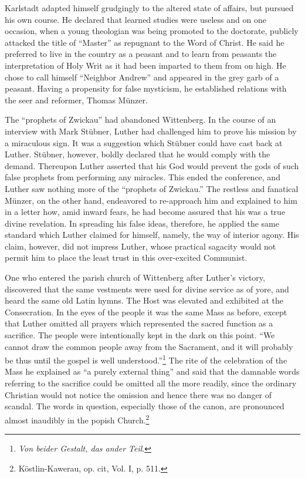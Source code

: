 Karlstadt adapted himself grudgingly to the altered state of affairs,
but pursued his own course. He declared that learned studies were
useless and on one occasion, when a young theologian was being promoted
to the doctorate, publicly attacked the title of “Master” as
repugnant to the Word of Christ. He said he preferred to live in the
country as a peasant and to learn from peasants the interpretation of
Holy Writ as it had been imparted to them from on high. He chose to
call himself “Neighbor Andrew” and appeared in the grey garb of a
peasant. Having a propensity for false mysticism, he established relations
with the seer and reformer, Thomas Münzer.

The “prophets of Zwickau” had abandoned Wittenberg. In the
course of an interview with Mark Stübner, Luther had challenged
him to prove his mission by a miraculous sign. It was a suggestion
which Stübner could have cast back at Luther. Stübner, however,
boldly declared that he would comply with the demand. Thereupon
Luther asserted that his God would prevent the gods of such false
prophets from performing any miracles. This ended the conference,
and Luther saw nothing more of the “prophets of Zwickau.” The
restless and fanatical Münzer, on the other hand, endeavored to re-approach
him and explained to him in a letter how, amid inward
fears, he had become assured that his was a true divine revelation. In
spreading his false ideas, therefore, he applied the same standard which
Luther claimed for himself, namely, the way of interior agony. His
claim, however, did not impress Luther, whose practical sagacity
would not permit him to place the least trust in this over-excited
Communist.

One who entered the parish church of Wittenberg after Luther’s
victory, discovered that the same vestments were used for divine service
as of yore, and heard the same old Latin hymns. The Host was
elevated and exhibited at the Consecration. In the eyes of the people
it was the same Mass as before, except that Luther omitted all prayers
which represented the sacred function as a sacrifice. The people were
intentionally kept in the dark on this point. “We cannot draw the
common people away from the Sacrament, and it will probably be
thus until the gospel is well understood.”\footnote{\textit{Von beider Gestalt, das ander Teil}.}
The rite of the celebration of the Mass he explained as “a purely external thing” and said
that the damnable words referring to the sacrifice could be omitted
all the more readily, since the ordinary Christian would not notice the
omission and hence there was no danger of scandal. The words in question,
especially those of the canon, are pronounced almost inaudibly
in the popish Church.\footnote{Köstlin-Kawerau, op. cit, Vol. I, p. 511.}
